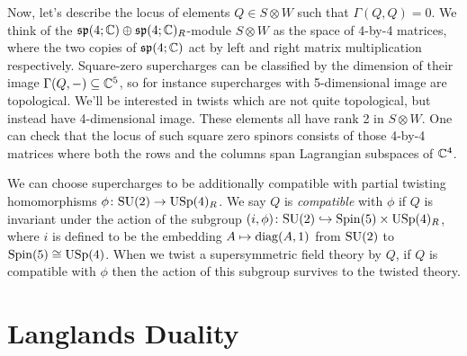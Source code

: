 \documentclass[10pt, oneside]{article}
\begin{document}
Now, let's describe the locus of elements $Q \in S \otimes W$ such that $\Gamma(Q,Q) = 0$.  We think of the $\mathfrak{sp}(4;\mathbb{C}) \oplus \mathfrak{sp}(4;\mathbb{C})_R$-module $S \otimes W$ as the space of 4-by-4 matrices, where the two copies of $\mathfrak{sp}(4;\mathbb{C})$ act by left and right matrix multiplication respectively.  Square-zero supercharges can be classified by the dimension of their image $\Gamma(Q,-) \subseteq \mathbb{C}^5$, so for instance supercharges with 5-dimensional image are topological.  We'll be interested in twists which are not quite topological, but instead have 4-dimensional image.  These elements all have rank 2 in $S \otimes W$.  One can check that the locus of such square zero spinors consists of those 4-by-4 matrices where both the rows and the columns span Lagrangian subspaces of $\mathbb{C}^4$.

We can choose supercharges to be additionally compatible with partial twisting homomorphisms $\phi \colon \mathrm{SU}(2) \to \mathrm{USp}(4)_R$.  We say $Q$ is \emph{compatible} with $\phi$ if $Q$ is invariant under the action of the subgroup $(i,\phi) \colon \mathrm{SU}(2) \hookrightarrow \mathrm{Spin}(5) \times \mathrm{USp}(4)_R$, where $i$ is defined to be the embedding $A \mapsto \mathrm{diag}(A,1)$ from $\mathrm{SU}(2)$ to $\mathrm{Spin}(5) \cong \mathrm{USp}(4)$.  When we twist a supersymmetric field theory by $Q$, if $Q$ is compatible with $\phi$ then the action of this subgroup survives to the twisted theory. 


\section{Langlands Duality}
\end{document}
